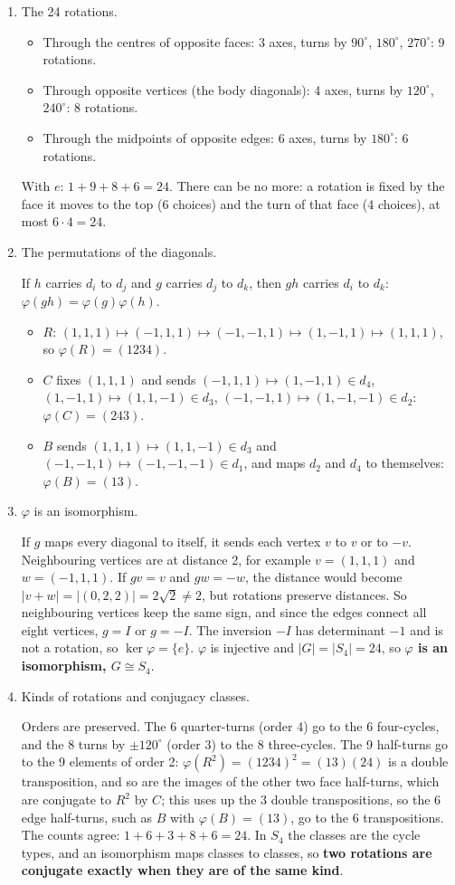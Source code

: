 \documentclass[11pt,a4paper]{article}
\newcommand{\prob}[1]{\par\vspace{1.1em}\noindent{\bfseries\large #1}\par\vspace{0.1em}}
\newenvironment{parts}{\begin{enumerate}[label=\textbf{(\alph*)},leftmargin=2.2em,itemsep=0.6em,topsep=0.2em]}{\end{enumerate}}
\newcommand{\pq}[1]{\item {\color{black!60}#1}\par}
\newcommand{\ans}[1]{{\boldmath\bfseries #1}}
\begin{document}
\prob{5. Rotations of a cube}
\begin{parts}
\pq{The 24 rotations.}
\begin{itemize}
  \item Through the centres of opposite faces: 3 axes, turns by $90^\circ$, $180^\circ$, $270^\circ$: 9 rotations.
  \item Through opposite vertices (the body diagonals): 4 axes, turns by $120^\circ$, $240^\circ$: 8 rotations.
  \item Through the midpoints of opposite edges: 6 axes, turns by $180^\circ$: 6 rotations.
\end{itemize}
With $e$: \ans{$1 + 9 + 8 + 6 = 24$}. There can be no more: a rotation is fixed by the face it moves to the top (6 choices) and the turn of that face (4 choices), at most $6 \cdot 4 = 24$.

\pq{The permutations of the diagonals.}
If $h$ carries $d_i$ to $d_j$ and $g$ carries $d_j$ to $d_k$, then $gh$ carries $d_i$ to $d_k$: $\varphi(gh) = \varphi(g)\varphi(h)$.
\begin{itemize}
  \item $R$: $(1, 1, 1) \mapsto (-1, 1, 1) \mapsto (-1, -1, 1) \mapsto (1, -1, 1) \mapsto (1, 1, 1)$, so \ans{$\varphi(R) = (1234)$}.
  \item $C$ fixes $(1, 1, 1)$ and sends $(-1, 1, 1) \mapsto (1, -1, 1) \in d_4$, $(1, -1, 1) \mapsto (1, 1, -1) \in d_3$, $(-1, -1, 1) \mapsto (1, -1, -1) \in d_2$: \ans{$\varphi(C) = (243)$}.
  \item $B$ sends $(1, 1, 1) \mapsto (1, 1, -1) \in d_3$ and $(-1, -1, 1) \mapsto (-1, -1, -1) \in d_1$, and maps $d_2$ and $d_4$ to themselves: \ans{$\varphi(B) = (13)$}.
\end{itemize}

\pq{$\varphi$ is an isomorphism.}
If $g$ maps every diagonal to itself, it sends each vertex $v$ to $v$ or to $-v$. Neighbouring vertices are at distance 2, for example $v = (1, 1, 1)$ and $w = (-1, 1, 1)$. If $gv = v$ and $gw = -w$, the distance would become $|v + w| = |(0, 2, 2)| = 2\sqrt2 \ne 2$, but rotations preserve distances. So neighbouring vertices keep the same sign, and since the edges connect all eight vertices, $g = I$ or $g = -I$. The inversion $-I$ has determinant $-1$ and is not a rotation, so \ans{$\ker\varphi = \{e\}$}. $\varphi$ is injective and $|G| = |S_4| = 24$, so \ans{$\varphi$ is an isomorphism, $G \cong S_4$}.

\pq{Kinds of rotations and conjugacy classes.}
Orders are preserved. The 6 quarter-turns (order 4) go to the 6 four-cycles, and the 8 turns by $\pm 120^\circ$ (order 3) to the 8 three-cycles. The 9 half-turns go to the 9 elements of order 2: $\varphi(R^2) = (1234)^2 = (13)(24)$ is a double transposition, and so are the images of the other two face half-turns, which are conjugate to $R^2$ by $C$; this uses up the 3 double transpositions, so the 6 edge half-turns, such as $B$ with $\varphi(B) = (13)$, go to the 6 transpositions. The counts agree: $1 + 6 + 3 + 8 + 6 = 24$. In $S_4$ the classes are the cycle types, and an isomorphism maps classes to classes, so \ans{two rotations are conjugate exactly when they are of the same kind}.


\end{parts}
\end{document}

